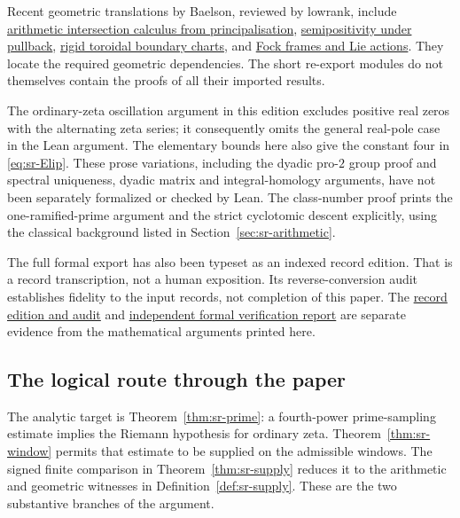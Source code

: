 Recent geometric translations by Baelson, reviewed by lowrank, include
\href{https://principia-math.com/api/rh/step?name=Development.AbelianVarietyTheory.Proofs.DivisorProofs.ArCalcOfPrincipalisation}{arithmetic intersection calculus from principalisation},
\href{https://principia-math.com/api/rh/step?name=Development.AbelianVarietyTheory.Proofs.DivisorProofs.SemiPullOfPrincipalisation}{semipositivity under pullback},
\href{https://principia-math.com/api/rh/step?name=Development.AbelianVarietyTheory.Proofs.DivisorProofs.RigidBoundaryChartsForFanUnitaryDatumStatement}{rigid toroidal boundary charts}, and
\href{https://principia-math.com/api/rh/step?name=Development.AbelianVarietyTheory.Proofs.DivisorProofs.ExistsFramesFockMapPolynomialLieActionsStatement}{Fock frames and Lie actions}.
They locate the required geometric dependencies.
The short re-export modules do not themselves contain the proofs of
all their imported results.

The ordinary-zeta oscillation argument in this edition excludes positive
real zeros with the alternating zeta series; it consequently omits the
general real-pole case in the Lean argument.
The elementary bounds here also give the constant four in
\eqref{eq:sr-Elip}. These prose variations, including the dyadic pro-\(2\) group proof and
spectral uniqueness, dyadic matrix and integral-homology arguments,
have not been
separately formalized or checked by Lean.
The class-number proof prints the one-ramified-prime argument and the
strict cyclotomic descent explicitly, using the classical background
listed in Section~\ref{sec:sr-arithmetic}.

The full formal export has also been typeset as an indexed record edition.
That is a record transcription, not a human exposition.
Its reverse-conversion audit establishes fidelity to the input records,
not completion of this paper.
The
\href{https://github.com/ChristianKudeba/alpoge-rh-verification/releases/tag/rh-literal-audit-v1}{record edition and audit}
and
\href{https://math.mit.edu/~drew/grh/}{independent formal verification report}
are separate evidence from the mathematical arguments printed here.


\subsection*{The logical route through the paper}
The analytic target is Theorem~\ref{thm:sr-prime}: a
fourth-power prime-sampling estimate implies the Riemann
hypothesis for ordinary zeta. Theorem~\ref{thm:sr-window}
permits that estimate to be supplied on the admissible
windows. The signed finite comparison in
Theorem~\ref{thm:sr-supply} reduces it to the arithmetic
and geometric witnesses in Definition~\ref{def:sr-supply}.
These are the two substantive branches of the argument.

